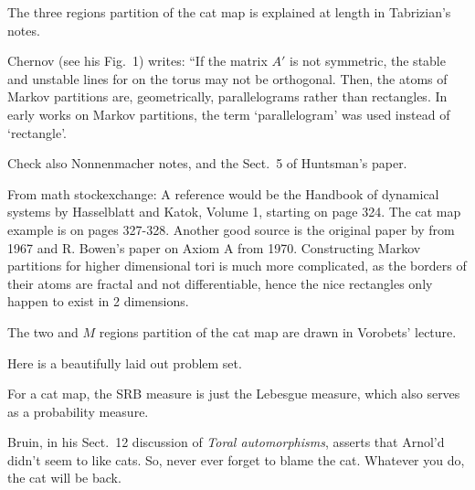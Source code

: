 \begin{description}
{The three regions partition of the cat map is explained at length in
{Tabrizian}'s notes.

{Chernov} (see his Fig.~1) writes:
``If the matrix $A'$ is not symmetric, the stable and unstable lines for on the
torus may not be orthogonal. Then, the atoms of Markov partitions are,
geometrically, parallelograms rather than rectangles. In early works on Markov
partitions, the term `parallelogram' was used instead of `rectangle'.

Check also
{Nonnenmacher} notes,
and the Sect.~5 of
{Huntsman}'s paper.

From
{math stockexchange}:
A reference would be the Handbook of dynamical systems by Hasselblatt and
Katok, Volume 1, starting on page 324. The cat map example is on
pages 327-328. Another good source is the original paper by \AW{}
from 1967 and R. Bowen's paper on Axiom A from 1970. Constructing Markov
partitions for higher dimensional tori is much more complicated, as the
borders of their atoms are fractal and not differentiable, hence the nice
rectangles only happen to exist in 2 dimensions.

The two and $M$ regions partition of the cat map are drawn in
{Vorobets}' lecture.

Here is a beautifully laid out
{problem set}.

For a cat map, the SRB measure is just the Lebesgue measure,
which also serves as a probability measure.

 {Bruin}, in his {Sect.~12}
discussion of {\em Toral automorphisms}, asserts that Arnol'd didn't seem to
like cats.
So, never ever forget to blame the
{cat}. Whatever you do, the cat will be
{back}.
    }



\end{description}
